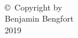 
\thispagestyle{empty}
\hbox{\ }

\vfill
\renewcommand{\baselinestretch}{1}
\small\normalsize

\vspace{-.65in}

\begin{center}
\large{\copyright \hbox{ }Copyright by\\
Benjamin Bengfort  %
\\
2019}
\end{center}

\vfill

\newpage

\hbox{\ }
\newpage
